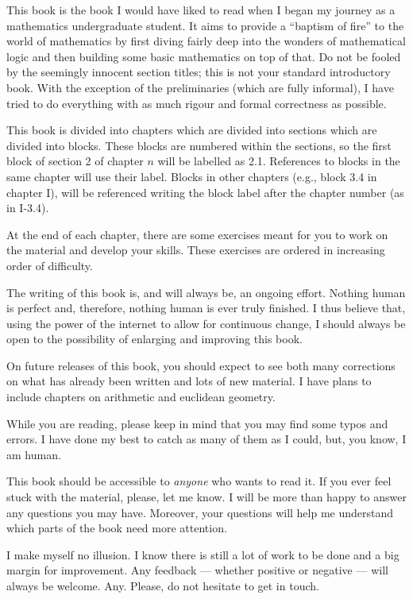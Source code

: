 
\begin{para*}
This book is the book I would have liked to read when I began my journey as a mathematics undergraduate student.
It aims to provide a ``baptism of fire'' to the world of mathematics by first diving fairly deep into the wonders of mathematical logic and then building some basic mathematics on top of that. Do not be fooled by the seemingly innocent section titles; this is not your standard introductory book.
With the exception of the preliminaries (which are fully informal), I have tried to do everything with as much rigour and formal correctness as possible. 
\end{para*}


\begin{para*}
This book is divided into chapters which are divided into sections which are divided into blocks. These blocks are numbered within the sections, so the first block of section 2 of chapter $n$ will be labelled as 2.1.
References to blocks in the same chapter will use their label. Blocks in other chapters (e.g., block 3.4 in chapter I), will be referenced writing the block label after the chapter number (as in I-3.4).

At the end of each chapter, there are some exercises meant for you to work on the material and develop your skills. These exercises are ordered in increasing order of difficulty.
\end{para*}

\begin{para*}
The writing of this book is, and will always be, an ongoing effort.
Nothing human is perfect and, therefore, nothing human is ever truly finished. I thus believe that, using the power of the internet to allow for continuous change, I should always be open to the possibility of enlarging and improving this book.

On future releases of this book, you should expect to see both many corrections on what has already been written and lots of new material. I have plans to include chapters on arithmetic and euclidean geometry. 

While you are reading, please keep in mind that you may find some typos and errors. I have done my best to catch as many of them as I could, but, you know, I am human.
\end{para*}

\begin{para*}
This book should be accessible to \emph{anyone} who wants to read it. If you ever feel stuck with the material, please, let me know. I will be more than happy to answer any questions you may have. Moreover, your questions will help me understand which parts of the book need more attention.

I make myself no illusion. I know there is still a lot of work to be done and a big margin for improvement. Any feedback --- whether positive or negative --- will always be welcome. Any. Please, do not hesitate to get in touch.  
\end{para*}

